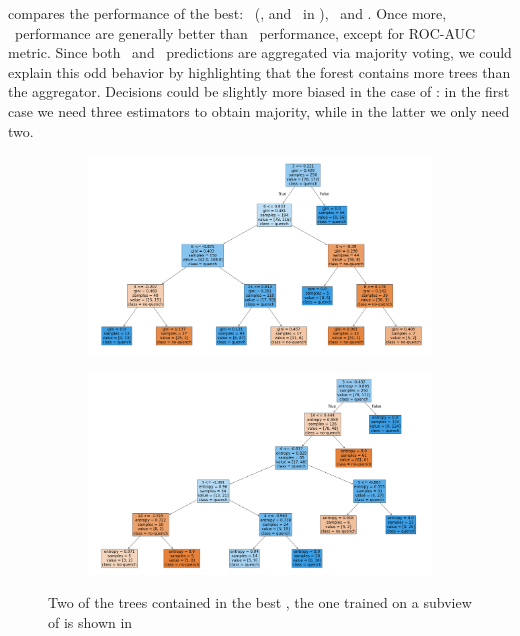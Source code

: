 \noindent{} compares the performance of the best: \ta\ (\an, \bn and \cnmod\ in
), \rf\ and \svc. Once more, \ta\ performance are generally better
than \rf\ performance, except for ROC-AUC metric. Since both \ta\ and \rf\
predictions are aggregated via majority voting, we could explain this odd
behavior by highlighting that the forest contains more trees than the aggregator. Decisions could be
slightly more biased in the case of \ta: in the first case we need three estimators to obtain
majority, while in the latter we only need two.
\begin{figure}[!ht]
	\centering
	\begin{subfigure}{\linewidth}
		\includegraphics[width=\linewidth]{img/Bn_3_6_8_15_pt_dt.png}
	\end{subfigure}
	\begin{subfigure}{\linewidth}
		\includegraphics[width=\linewidth]{img/Cnmod_3_4_5_14_pt_dt.png}
	\end{subfigure}
	\caption{Two of the trees contained in the best \ta, the one trained on a subview of \an is
		shown in \Cref{fig:dt-an-2-12-pt}} \label{fig:part-of-bta}
\end{figure}

